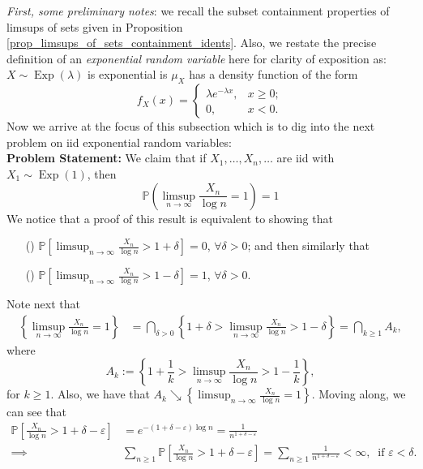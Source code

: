 \documentclass[12pt,reqno]{article}
\renewcommand{\emph}[1]{\textit{#1}}
\theoremstyle{plain}
\theoremstyle{definition}
\begin{document}
\emph{First, some preliminary notes}: we recall the subset containment properties of 
limsups of sets given in Proposition \ref{prop_limsups_of_sets_containment_idents}. 
Also, we restate the precise definition of an \emph{exponential random variable} here 
for clarity of exposition as: $X \sim \operatorname{Exp}(\lambda)$ is exponential is 
$\mu_X$ has a density function of the form 
\[
f_X(x) = \begin{cases} 
     \lambda e^{-\lambda x}, & x \geq 0; \\ 
     0, & x < 0.
     \end{cases} 
\]
Now we arrive at the focus of this subsection which is to dig into the 
next problem on iid exponential random variables: \\ 
\textbf{Problem Statement:} 
We claim that if $X_1,\ldots,X_n,\ldots$ are iid with 
$X_1 \sim \operatorname{Exp}(1)$, then 
\[
\mathbb{P}\left(\limsup_{n \rightarrow \infty} \frac{X_n}{\log n} = 1\right) = 1
\]
We notice that a proof of this result is equivalent to showing that 
\begin{itemize} 

\item[(\faLinux)] $\mathbb{P}\left[\limsup_{n \rightarrow \infty} \frac{X_n}{\log n} > 
     1 + \delta\right] = 0$, $\forall \delta > 0$; and then similarly that 
\item[(\faCoffee)] $\mathbb{P}\left[\limsup_{n \rightarrow \infty} 
     \frac{X_n}{\log n} > 1 - \delta\right] = 1$, $\forall \delta > 0$. 

\end{itemize} 
Note next that 
\begin{align*} 
\left\{\limsup_{n \rightarrow \infty} \frac{X_n}{\log n} = 1\right\} & = \bigcap_{\delta > 0} 
     \left\{1 + \delta > \limsup_{n \rightarrow \infty} \frac{X_n}{\log n} > 1 - \delta\right\} = 
     \bigcap_{k \geq 1} A_k, 
\end{align*} 
where $$A_k := \left\{1+\frac{1}{k} > \limsup_{n \rightarrow \infty} \frac{X_n}{\log n} > 1 - \frac{1}{k}\right\},$$ 
for $k \geq 1$. Also, we have that $A_k \searrow \left\{\limsup_{n \rightarrow \infty} \frac{X_n}{\log n} = 1\right\}$. 
Moving along, we can see that 
\begin{align*} 
\mathbb{P}\left[\frac{X_n}{\log n} > 1 + \delta - \varepsilon\right] & = e^{-(1+\delta-\varepsilon)\log n} = 
     \frac{1}{n^{1+\delta-\varepsilon}} \\ 
     \implies & \sum_{n \geq 1} \mathbb{P}\left[\frac{X_n}{\log n} > 1 + \delta - \varepsilon\right] = 
     \sum_{n \geq 1} \frac{1}{n^{1+\delta-\varepsilon}} < \infty,\ \text{ if } \varepsilon < \delta. 
\end{align*} 
\end{document}
